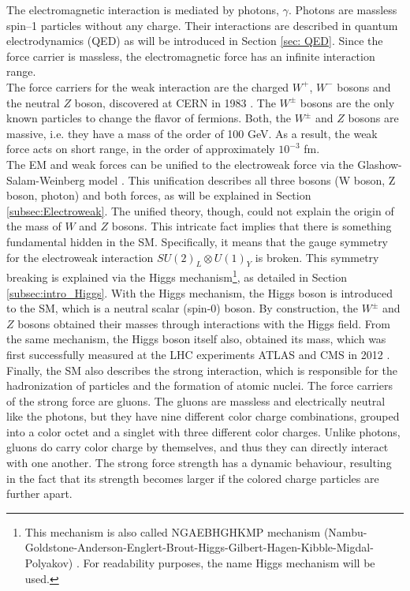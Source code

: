 \indent The electromagnetic interaction is mediated by photons, $\gamma$.  Photons are massless spin–1 particles without any charge. Their interactions are described in quantum electrodynamics (QED) as will be introduced in Section \ref{sec: QED}. Since the force carrier is massless, the electromagnetic force has an infinite interaction range.\\
\indent The force carriers for the weak interaction are the charged $W^+$, $W^-$ bosons and the neutral $Z$ boson, discovered at CERN in 1983 \cite{ARNISON1983103, BAGNAIA1983130}. The $W^\pm$ bosons are the only known particles to change the flavor of fermions. Both, the $W^\pm$ and $Z$ bosons are massive, i.e. they have a mass of the order of 100 GeV. As a result, the weak force acts on short range, in the order of approximately $ 10^{-3} $ fm.\\
\indent  The EM and weak forces can be unified to the electroweak force via the Glashow-Salam-Weinberg model \cite{Weinberg_Electroweak, SALAM_Electroweak, GLASHOW_Electroweak}. This unification describes all three bosons (W boson, Z boson, photon) and both forces, as will be explained in Section \ref{subsec:Electroweak}. The unified theory, though, could not explain the origin of the mass of $W$ and $Z$ bosons. This intricate fact implies that there is something fundamental hidden in the SM. Specifically, it means that the gauge symmetry for the electroweak interaction $ SU(2)_L \otimes U(1)_Y$ is broken. This symmetry breaking is explained via the Higgs mechanism\footnote{This mechanism is also called NGAEBHGHKMP mechanism (Nambu-Goldstone-Anderson-Englert-Brout-Higgs-Gilbert-Hagen-Kibble-Migdal-Polyakov) \cite{HiggsMechanism1, HiggsMechanism2, HiggsMechanism3, HiggsMechanism4, HiggsMechanism5,HiggsMechanism6,HiggsMechanism7,HiggsMechanism8,HiggsMechanism9,HiggsMechanism10,HiggsMechanism11,HiggsMechanism12,HiggsMechanism13}. For readability purposes, the name Higgs mechanism will be used.}, as detailed in Section \ref{subsec:intro_Higgs}. With the Higgs mechanism, the Higgs boson is introduced to the SM, which is a neutral scalar (spin-0) boson. By construction, the $W^\pm$ and $Z$ bosons obtained their masses through interactions with the Higgs field. From the same mechanism, the Higgs boson itself also, obtained its mass, which was first successfully measured at the LHC experiments ATLAS and CMS in 2012 \cite{Higgs1, Higgs2, Higgs3}.\\
\indent Finally, the SM also describes the strong interaction, which is responsible for the hadronization of particles and the formation of atomic nuclei. The force carriers of the strong force are gluons. The gluons are massless and electrically neutral like the photons, but they have nine different color charge combinations, grouped into a color octet and a singlet with three different color charges. Unlike photons, gluons do carry color charge by themselves, and thus they can directly interact with one another. The strong force strength has a dynamic behaviour, resulting in the fact that its strength becomes larger if the colored charge particles are further apart.
